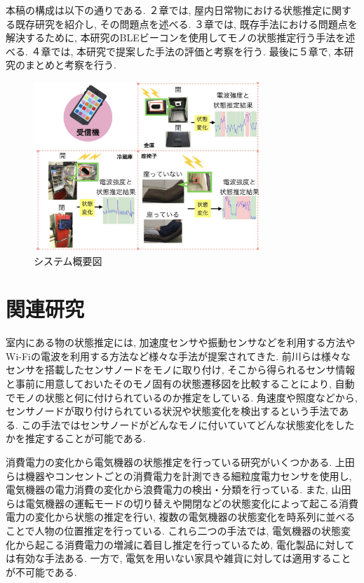 \documentclass[Japanese]{dicomopapers}
\begin{document}
本稿の構成は以下の通りである.
２章では, 屋内日常物における状態推定に関する既存研究を紹介し, その問題点を述べる.
３章では, 既存手法における問題点を解決するために, 本研究のBLEビーコンを使用してモノの状態推定行う手法を述べる.
４章では, 本研究で提案した手法の評価と考察を行う.
最後に５章で, 本研究のまとめと考察を行う.



\begin{figure}[ht]
 \centering
 \includegraphics[width=8.5cm]{abst.jpeg}
 \caption{システム概要図}
 \label{abst}
\end{figure}

\section{関連研究}
室内にある物の状態推定には, 加速度センサや振動センサなどを利用する方法やWi-Fiの電波を利用する方法など様々な手法が提案されてきた.
前川ら\cite{TagAndThink}は様々なセンサを搭載したセンサノードをモノに取り付け, そこから得られるセンサ情報と事前に用意しておいたそのモノ固有の状態遷移図を比較することにより, 自動でモノの状態と何に付けられているのか推定をしている.
角速度や照度などから, センサノードが取り付けられている状況や状態変化を検出するという手法である.
この手法ではセンサノードがどんなモノに付いていてどんな状態変化をしたかを推定することが可能である.


消費電力の変化から電気機器の状態推定を行っている研究がいくつかある.
上田ら\cite{sairyu}は機器やコンセントごとの消費電力を計測できる細粒度電力センサを使用し, 電気機器の電力消費の変化から浪費電力の検出・分類を行っている.
また, 山田ら\cite{energy}は電気機器の運転モードの切り替えや開閉などの状態変化によって起こる消費電力の変化から状態の推定を行い, 複数の電気機器の状態変化を時系列に並べることで人物の位置推定を行っている.
これら二つの手法では, 電気機器の状態変化から起こる消費電力の増減に着目し推定を行っているため, 電化製品に対しては有効な手法ある.
一方で, 電気を用いない家具や雑貨に対しては適用することが不可能である.
\end{document}
